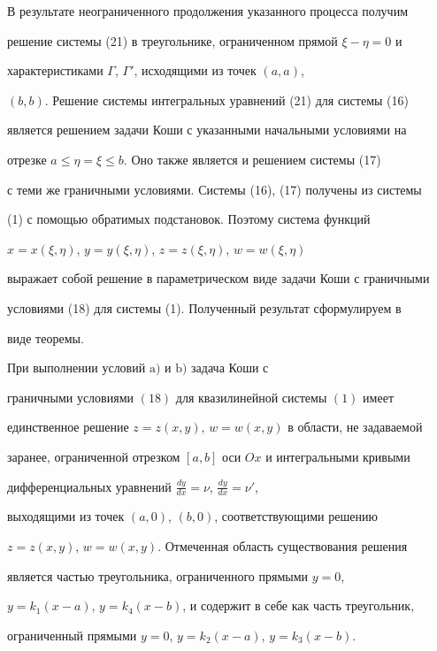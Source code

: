 В результате неограниченного продолжения указанного процесса получим 


решение системы (21) в треугольнике, ограниченном прямой $\xi-\eta=0$ и 


характеристиками $\Gamma$, $\Gamma'$, исходящими из точек $(a,a)$, 


$(b,b)$. Решение системы интегральных уравнений (21) для системы (16) 


является решением задачи Коши с указанными начальными условиями на 


отрезке $a\le\eta=\xi\le b$. Оно также является и решением системы (17) 


с теми же граничными условиями. Системы (16), (17) получены из системы 


(1) с помощью обратимых подстановок. Поэтому система функций 


$x=x(\xi,\eta)$, $y=y(\xi,\eta)$, $z=z(\xi,\eta)$, $w=w(\xi,\eta)$ 


выражает собой решение в параметрическом виде задачи Коши с граничными 


условиями (18) для системы (1). Полученный результат сформулируем в 


виде теоремы. 


 


\begin{thm} 


При выполнении условий $\mathrm a)$ и $\mathrm b)$ задача Коши с 


граничными условиями $(18)$ для квазилинейной системы $(1)$ имеет 


единственное решение $z=z(x,y)$, $w=w(x,y)$ в области, не задаваемой 


заранее, ограниченной отрезком $[a,b]$ оси $Ox$ и интегральными кривыми 


дифференциальных уравнений $\frac{dy}{dx}=\nu$, $\frac{dy}{dx}=\nu'$, 


выходящими из точек $(a,0)$, $(b,0)$, соответствующими решению 


$z=z(x,y)$, $w=w(x,y)$. Отмеченная область существования решения 


является частью треугольника, ограниченного прямыми $y=0$, 


$y=k_1(x-a)$, $y=k_4(x-b)$, и содержит в себе как часть треугольник, 


ограниченный прямыми $y=0$, $y=k_2(x-a)$, $y=k_3(x-b)$. 


\end{thm} 


